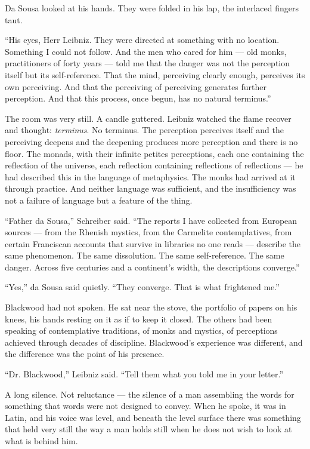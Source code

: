Da Sousa looked at his hands. They were folded in his lap, the interlaced fingers taut.

``His eyes, Herr Leibniz. They were directed at something with no location. Something I could not follow. And the men who cared for him --- old monks, practitioners of forty years --- told me that the danger was not the perception itself but its self-reference. That the mind, perceiving clearly enough, perceives its own perceiving. And that the perceiving of perceiving generates further perception. And that this process, once begun, has no natural terminus.''

The room was very still. A candle guttered. Leibniz watched the flame recover and thought: \emph{terminus}. No terminus. The perception perceives itself and the perceiving deepens and the deepening produces more perception and there is no floor. The monads, with their infinite petites perceptions, each one containing the reflection of the universe, each reflection containing reflections of reflections --- he had described this in the language of metaphysics. The monks had arrived at it through practice. And neither language was sufficient, and the insufficiency was not a failure of language but a feature of the thing.

``Father da Sousa,'' Schreiber said. ``The reports I have collected from European sources --- from the Rhenish mystics, from the Carmelite contemplatives, from certain Franciscan accounts that survive in libraries no one reads --- describe the same phenomenon. The same dissolution. The same self-reference. The same danger. Across five centuries and a continent's width, the descriptions converge.''

``Yes,'' da Sousa said quietly. ``They converge. That is what frightened me.''

\scenebreak

Blackwood had not spoken. He sat near the stove, the portfolio of papers on his knees, his hands resting on it as if to keep it closed. The others had been speaking of contemplative traditions, of monks and mystics, of perceptions achieved through decades of discipline. Blackwood's experience was different, and the difference was the point of his presence.

``Dr. Blackwood,'' Leibniz said. ``Tell them what you told me in your letter.''

A long silence. Not reluctance --- the silence of a man assembling the words for something that words were not designed to convey. When he spoke, it was in Latin, and his voice was level, and beneath the level surface there was something that held very still the way a man holds still when he does not wish to look at what is behind him.

